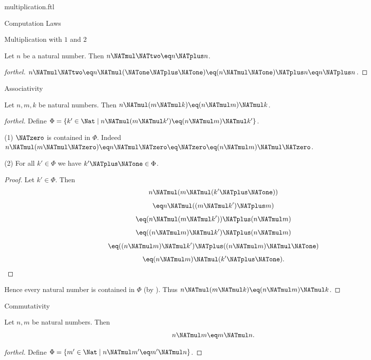 \documentclass{naproche-library}
\begin{document}
\begin{smodule}[title=Multiplication]{multiplication.ftl}
\begin{sfragment}{Computation Laws}
\begin{sfragment}{Multiplication with $1$ and $2$}
    \begin{corollary}[forthel,id=ARITHMETIC_06_5679541582299136]
      Let $n$ be a natural number.
      Then $n \NATmul \NATtwo \eq n \NATplus n$.
    \end{corollary}
    \begin{proof}[forthel]
      $n \NATmul \NATtwo
        \eq n \NATmul (\NATone \NATplus \NATone)
        \eq (n \NATmul \NATone) \NATplus n
        \eq n \NATplus n$.
    \end{proof}
  \end{sfragment}

  \begin{sfragment}{Associativity}
    \begin{proposition}[forthel,id=ARITHMETIC_06_347295585402880]
      Let $n, m, k$ be natural numbers.
      Then $n \NATmul (m \NATmul k) \eq (n \NATmul m) \NATmul k$.
    \end{proposition}
    \begin{proof}[forthel]
      Define $\Phi = \{ k' \in \Nat \mid n \NATmul (m \NATmul k') \eq (n \NATmul m) \NATmul k' \}$.

      (1) $\NATzero$ is contained in $\Phi$.
      Indeed $n \NATmul (m \NATmul \NATzero)
        \eq n \NATmul \NATzero
        \eq \NATzero
        \eq (n \NATmul m) \NATmul \NATzero$.

      (2) For all $k' \in \Phi$ we have $k' \NATplus \NATone \in \Phi$.
      \begin{proof}
        Let $k' \in \Phi$.
        Then
        \[  n \NATmul (m \NATmul (k' \NATplus \NATone))                          \]
        \[    \eq n \NATmul ((m \NATmul k') \NATplus m)                      \]
        \[    \eq (n \NATmul (m \NATmul k')) \NATplus (n \NATmul m)            \]
        \[    \eq ((n \NATmul m) \NATmul k') \NATplus (n \NATmul m)            \]
        \[    \eq ((n \NATmul m) \NATmul k') \NATplus ((n \NATmul m) \NATmul \NATone)  \]
        \[    \eq (n \NATmul m) \NATmul (k' \NATplus \NATone).                     \]
      \end{proof}

      Hence every natural number is contained in $\Phi$ (by ).
      Thus $n \NATmul (m \NATmul k) \eq (n \NATmul m) \NATmul k$.
    \end{proof}
  \end{sfragment}

  \begin{sfragment}{Commutativity}
    \begin{proposition}[forthel,id=ARITHMETIC_06_1764759896588288]
      Let $n, m$ be natural numbers.
      Then \[ n \NATmul m \eq m \NATmul n. \]
    \end{proposition}
    \begin{proof}[forthel]
      Define $\Phi = \{ m' \in \Nat \mid n \NATmul m' \eq m' \NATmul n \}$.


\end{proof}
\end{sfragment}
\end{sfragment}
\end{smodule}
\end{document}
